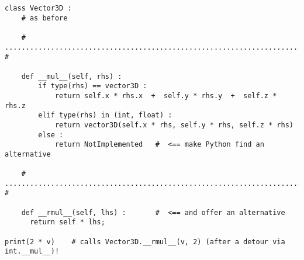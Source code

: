 
\begin{frame}[fragile]
%
\begin{codebox}
\begin{verbatim}
class Vector3D :
    # as before
    
    # ........................................................................ #
    
    def __mul__(self, rhs) :
        if type(rhs) == vector3D :
            return self.x * rhs.x  +  self.y * rhs.y  +  self.z * rhs.z
        elif type(rhs) in (int, float) :
            return vector3D(self.x * rhs, self.y * rhs, self.z * rhs)
        else :
            return NotImplemented   #  <== make Python find an alternative
    
    # ........................................................................ #
    
    def __rmul__(self, lhs) :       #  <== and offer an alternative
      return self * lhs;

print(2 * v)    # calls Vector3D.__rmul__(v, 2) (after a detour via int.__mul__)!
\end{verbatim}
\end{codebox}
%
\end{frame}



